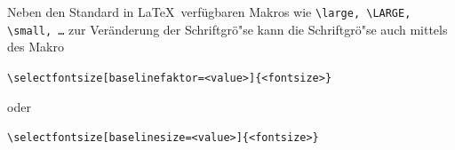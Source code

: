 
%
%
%
%
%
%
%
%
%
%
%
%
%
%

\noindent Neben den Standard in \LaTeX~verfügbaren Makros wie \texttt{\textbackslash large, \textbackslash LARGE, \textbackslash small, \ldots} zur Veränderung der Schriftgrö"se kann die Schriftgrö"se auch mittels des Makro

\begin{center}
\texttt{\textbackslash selectfontsize[baselinefaktor=<value>]\{<fontsize>\}}
\end{center}

\noindent oder

\begin{center}
\texttt{\textbackslash selectfontsize[baselinesize=<value>]\{<fontsize>\}}
\end{center}

